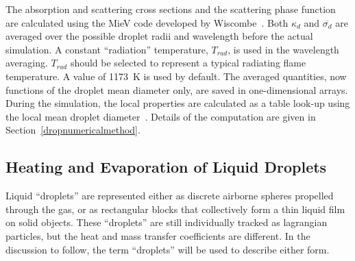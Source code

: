 \documentclass[11pt]{book}
\begin{document}
The absorption and scattering cross sections and the scattering phase
function are calculated using the MieV code developed by
Wiscombe~\cite{Wiscombe}.  Both $\kappa_d$ and $\overline{\sigma_d}$
are averaged over the possible droplet radii and wavelength before the
actual simulation.  A constant ``radiation'' temperature, $T_{rad}$,
is used in the wavelength averaging.  $T_{rad}$ should be selected to
represent a typical radiating flame temperature. A value of 1173~K is
used by default.  The averaged quantities, now functions of the
droplet mean diameter only, are saved in one-dimensional arrays.
During the simulation, the local properties are calculated as a table
look-up using the local mean droplet diameter~\cite{Hale:1}.  Details
of the computation are given in Section~\ref{dropnumericalmethod}.



\subsection{Heating and Evaporation of Liquid Droplets}

Liquid ``droplets'' are represented either as discrete airborne spheres propelled through the gas, or as rectangular blocks that collectively form a thin liquid film on solid objects.
These ``droplets'' are still individually tracked as
lagrangian particles, but the heat and mass transfer coefficients are different. In the discussion to follow, the term ``droplets'' will be used to describe either form.
\end{document}
